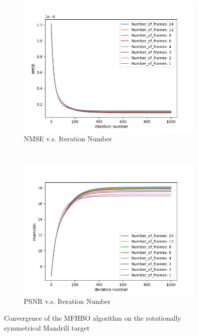 	\begin{figure}[H]
		\centering
		\begin{subfigure}[t]{0.7\textwidth}
			\centering
			\includegraphics[width=1.0\textwidth]{Mandrill_NMSE_vs_iter.png}
			\caption{NMSE v.s. Iteration Number}
			\label{fig:Mandrill_NMSE_vs_iter}
		\end{subfigure}
		\\
		\begin{subfigure}[t]{0.7\textwidth}
			\centering
			\includegraphics[width=1.0\textwidth]{Mandrill_PSNR_vs_iter.png}
			\caption{PSNR v.s. Iteration Number}
			\label{fig:Mandrill_PSNR_vs_iter}
		\end{subfigure}
		\caption{Convergence of the MFHBO algorithm on the rotationally symmetrical Mandrill target}
		\label{fig:Convergence of optimisation}
	\end{figure}

